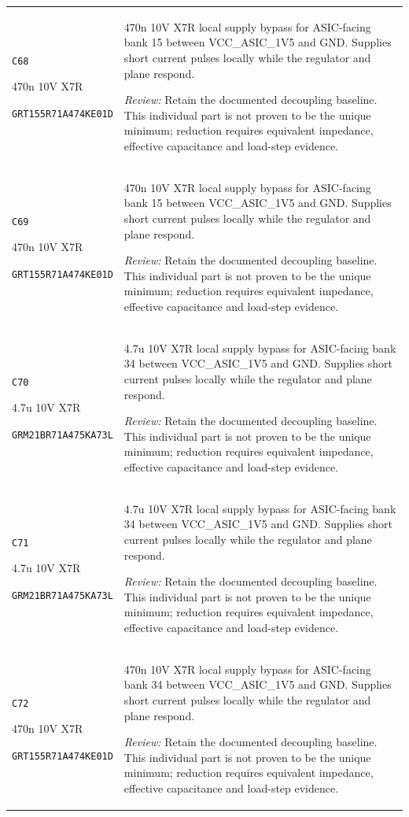 \documentclass[10pt,a4paper]{article}
\begin{document}
\begin{longtable}{@{}P{46mm}P{117mm}@{}}
\nolinkurl{C68}\par 470n 10V X7R\par\scriptsize \nolinkurl{GRT155R71A474KE01D} & 470n 10V X7R local supply bypass for ASIC-facing bank 15 between VCC\_ASIC\_1V5 and GND. Supplies short current pulses locally while the regulator and plane respond.\par\smallskip\textit{Review:} Retain the documented decoupling baseline. This individual part is not proven to be the unique minimum; reduction requires equivalent impedance, effective capacitance and load-step evidence. \\
\nolinkurl{C69}\par 470n 10V X7R\par\scriptsize \nolinkurl{GRT155R71A474KE01D} & 470n 10V X7R local supply bypass for ASIC-facing bank 15 between VCC\_ASIC\_1V5 and GND. Supplies short current pulses locally while the regulator and plane respond.\par\smallskip\textit{Review:} Retain the documented decoupling baseline. This individual part is not proven to be the unique minimum; reduction requires equivalent impedance, effective capacitance and load-step evidence. \\
\nolinkurl{C70}\par 4.7u 10V X7R\par\scriptsize \nolinkurl{GRM21BR71A475KA73L} & 4.7u 10V X7R local supply bypass for ASIC-facing bank 34 between VCC\_ASIC\_1V5 and GND. Supplies short current pulses locally while the regulator and plane respond.\par\smallskip\textit{Review:} Retain the documented decoupling baseline. This individual part is not proven to be the unique minimum; reduction requires equivalent impedance, effective capacitance and load-step evidence. \\
\nolinkurl{C71}\par 4.7u 10V X7R\par\scriptsize \nolinkurl{GRM21BR71A475KA73L} & 4.7u 10V X7R local supply bypass for ASIC-facing bank 34 between VCC\_ASIC\_1V5 and GND. Supplies short current pulses locally while the regulator and plane respond.\par\smallskip\textit{Review:} Retain the documented decoupling baseline. This individual part is not proven to be the unique minimum; reduction requires equivalent impedance, effective capacitance and load-step evidence. \\
\nolinkurl{C72}\par 470n 10V X7R\par\scriptsize \nolinkurl{GRT155R71A474KE01D} & 470n 10V X7R local supply bypass for ASIC-facing bank 34 between VCC\_ASIC\_1V5 and GND. Supplies short current pulses locally while the regulator and plane respond.\par\smallskip\textit{Review:} Retain the documented decoupling baseline. This individual part is not proven to be the unique minimum; reduction requires equivalent impedance, effective capacitance and load-step evidence. \\

\end{longtable}
\end{document}
